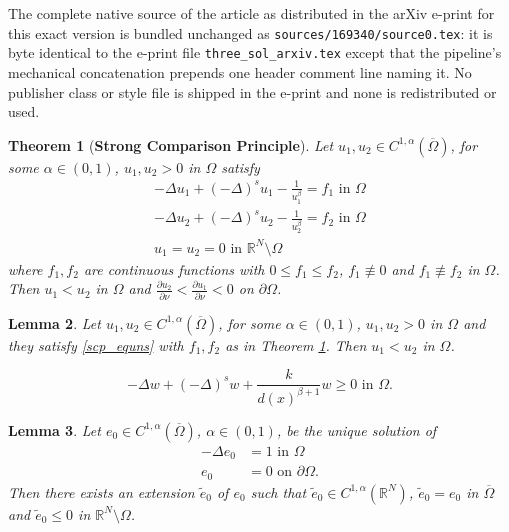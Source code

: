 \documentclass[10pt,a4paper]{amsart}
\newtheorem{theorem}{Theorem}
\newtheorem{lemma}[theorem]{Lemma}
\newcommand{\De}{\Delta}
\newcommand{\Om}{\Omega}
\newcommand{\ba}{\beta}
\newcommand{\pa}{\partial}
\newcommand{\sr}{\mathbb{R}}
\newcommand{\omc}{(\overline{\Om})}
\newcommand{\bdry}{\mathbb{R}^N \setminus \Omega}
\begin{document}
The complete native source of the article as distributed in the arXiv e-print for this exact version is bundled unchanged as \texttt{sources/169340/source0.tex}: it is byte identical to the e-print file \texttt{three\_sol\_arxiv.tex} except that the pipeline's mechanical concatenation prepends one header comment line naming it. No publisher class or style file is shipped in the e-print and none is redistributed or used.
\begin{theorem}[\textbf{Strong Comparison Principle}]\label{Hopf lemma_linear case}
    Let $u_1, u_2 \in C^{1,\alpha}(\overline{\Om})$, for some $\alpha\in(0,1)$, $u_1, u_2 > 0$ in $\Om$ satisfy 
    \begin{equation}\label{scp_equns}
        \begin{aligned}
            -\Delta u_1 + (-\De)^s u_1 - \frac{1}{u_1^{\ba}} = f_1 \text{ in } \Om\\
            -\Delta u_2 + (-\De)^s u_2 - \frac{1}{u_2^{\ba}} = f_2 \text{ in } \Om\\
            u_1 =u_2 =0 \text{ in } \bdry
        \end{aligned}
    \end{equation}
    where $f_1,f_2$ are continuous functions with $0 \leq f_1 \leq f_2$, $f_1 \not\equiv 0$ and $f_1 \not\equiv f_2$ in $\Om$. Then $u_1 < u_2$ in $\Om$ and $\frac{\pa u_2}{\pa\nu} < \frac{\pa u_1}{\pa\nu} < 0$ on $\pa\Om$.
\end{theorem}

\begin{lemma}\label{strict comparison}
    Let $u_1, u_2 \in C^{1,\alpha}(\overline{\Om})$, for some $\alpha\in(0,1)$, $u_1, u_2 > 0$ in $\Om$ and they satisfy \eqref{scp_equns} with $f_1, f_2$ as in Theorem \ref{Hopf lemma_linear case}. Then $u_1<u_2$ in $\Om$.
\end{lemma}

    \begin{equation}\label{w_equn}
        -\Delta w + (-\De)^s w + \frac{k}{d(x)^{\ba +1}} w \geq 0 \text{ in } \Om.
    \end{equation}

\begin{lemma}\label{extension of e}
    Let $e_0 \in C^{1,\alpha} \omc$, $\alpha \in (0,1)$, be the unique solution of
    \begin{equation}\label{e_0 equation}
        \begin{aligned}
            -\Delta e_0 &=1 \text{ in } \Om\\
            e_0 &= 0 \text{ on } \pa\Om.
        \end{aligned}
    \end{equation}
    Then there exists an extension $\tilde{e}_0$ of $e_0$ such that $\tilde{e}_0 \in C^{1,\alpha} (\sr^N)$, $\tilde{e}_0 = e_0$ in $\overline{\Om}$ and $\tilde{e}_0 \leq 0$ in $\sr^N \setminus \Om$.
\end{lemma}
\end{document}
